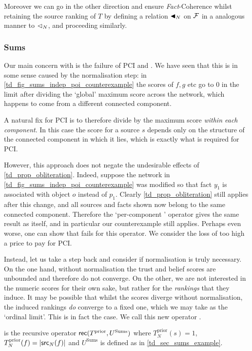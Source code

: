 Moreover we can go in the other direction and ensure \emph{Fact}-Coherence
whilst retaining the source ranking of $T$ by defining a relation $\mathrel{\blacktriangleleft}_N$ on
$\mathcal{F}$ in a analogous manner to $\mathrel{\lhd}_N$, and proceeding similarly.

\subsubsection{Sums}

Our main concern with \sums{} is the failure of PCI and \monotonicity{}.  We have
seen that this is in some sense caused by the normalisation step: in
\cref{td_fig_sums_indep_poi_counterexample} the scores of $f, g$ etc go to 0 in
the limit after dividing the `global' maximum score across the network, which
happens to come from a different connected component.

A natural fix for PCI is to therefore divide by the maximum score
\emph{within each component}. In this case the score for a source $s$ depends
only on the structure of the connected component in which it lies, which is
exactly what is required for PCI.

However, this approach does not negate the undesirable effects of
\cref{td_prop_obliteration}. Indeed, suppose the network in
\cref{td_fig_sums_indep_poi_counterexample} was modified so that fact $y_1$ is
associated with object $o$ instead of $p_1$. Clearly \cref{td_prop_obliteration}
still applies after this change, and all sources and facts shown now belong to
the same connected component. Therefore the `per-component \sums{}' operator
gives the same result as \sums{} itself, and in particular our \monotonicity{}
counterexample still applies. Perhaps even worse, one can show that
\coherence{}
fails for this operator. We consider the loss of \coherence{} too high a price to
pay for PCI.

Instead, let us take a step back and consider if normalisation is truly
necessary. On the one hand, without normalisation the trust and belief scores
are unbounded and therefore do not converge. On the other, we are not
interested in the numeric scores for their own sake, but rather for the
\emph{rankings} that they induce. It may be possible that whilst the scores
diverge without normalisation, the induced rankings \emph{do} converge to a
fixed one, which we may take as the `ordinal limit'. This is in fact the case.
We call this new operator \usums{}.

\begin{definition}

\usums{} is the recursive operator $\mathsf{rec}(T^{\text{prior}}, U^{\text{Sums}})$
where $T_N^{\text{prior}}(s) = 1$, $T_N^{\text{prior}}(f) = |\mathsf{src}_N(f)|$ and
$U^{\text{Sums}}$ is defined as in \cref{td_sec_sums_example}.\footnotemark{}

\end{definition}

